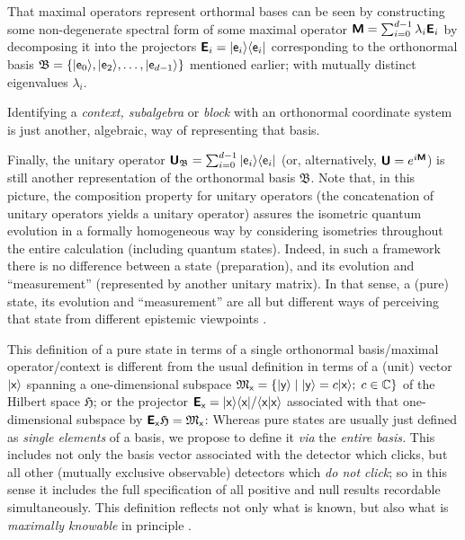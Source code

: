 \documentclass[%
  preprint,
 showpacs,
 showkeys,
 preprintnumbers,
 amsmath,amssymb,
 aps,
   pra,
  longbibliography,
 ]{revtex4-1}
\begin{document}
That maximal operators represent orthormal bases can be seen by constructing some non-degenerate spectral form
of some maximal operator
$\textsf{\textbf{M}} =\sum_{i=0}^{d-1} \lambda_i\textsf{\textbf{E}}_{i}$
by decomposing it into the projectors
$\textsf{\textbf{E}}_{i}= \vert {\textsf e}_i \rangle \langle {\textsf e}_i \vert$
corresponding to the orthonormal basis
${\mathfrak B} =\{ \vert {\textsf e}_0 \rangle, \vert {\textsf e}_2 \rangle, \ldots , \vert {\textsf e}_{d-1} \rangle \}$
mentioned earlier; with mutually distinct eigenvalues $\lambda_i$.


Identifying a {\em context, subalgebra} or {\em block} with an orthonormal coordinate system is just another, algebraic, way of representing that basis.

Finally, the unitary operator
$\textsf{\textbf{U}}_{{\mathfrak B}}=   \sum_{i=0}^{d-1}  \vert {\textsf e}_i\rangle \langle {\textsf e}_i \vert $
(or, alternatively,   $\textsf{\textbf{U}} = e^{i \textsf{\textbf{M}}}$)
is still another representation of the orthonormal basis ${\mathfrak B}$.
Note that, in this picture, the composition property
for unitary operators (the concatenation of unitary operators yields a unitary operator)
assures the isometric quantum evolution  in a formally homogeneous way by considering isometries throughout the entire calculation (including quantum states).
Indeed, in such a framework there is no difference between a state (preparation), and its evolution and ``measurement'' (represented by another
unitary matrix).
In that sense, a (pure) state, its evolution and ``measurement'' are all but different ways of perceiving that state from different epistemic
viewpoints \cite{DallaChiara-epistemic}.


This definition of a pure state in terms of a single orthonormal basis/maximal operator/context
is different from the usual definition in terms of a (unit) vector $\vert {\textsf x}\rangle$
spanning a one-dimensional subspace ${\mathfrak M}_{\textsf x}= \{ \vert {\textsf y}\rangle \mid  \vert {\textsf y}\rangle= c  \vert {\textsf x}\rangle; \; c\in {\mathbb C} \}$
of the Hilbert space ${\mathfrak H}$; or the projector
$\textsf{\textbf{E}}_{\textsf x}= \vert {\textsf x} \rangle \langle {\textsf x}\vert /  \langle {\textsf x} \vert {\textsf x}\rangle $
associated with that
one-dimensional subspace by $\textsf{\textbf{E}}_{\textsf x}{\mathfrak H}={\mathfrak M}_{\textsf x}$:
Whereas pure states are usually just defined as {\em single elements} of a basis,
we propose to define it {\em via} the {\em entire basis.}
This includes not only the basis vector associated with the detector which clicks,
but all other (mutually exclusive observable) detectors which {\em do not click};
so in this sense it includes the full specification of all positive and null results recordable simultaneously.
This definition reflects not only what is known, but also what is {\em maximally knowable} in principle \cite{mandel-operational-cat}.
\end{document}
